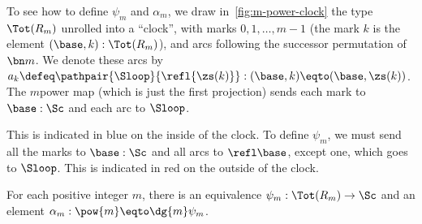 To see how to define $\psi_m$ and $\alpha_m$,
we draw in~\cref{fig:m-power-clock} the type $\Tot(R_m)$
unrolled into a ``clock'', with marks $0,1,\dots,m-1$
(the mark $k$ is the element $(\base,k):\Tot(R_m)$),
and arcs following the successor permutation of $\bn m$.
We denote these arcs by
$a_k \defeq \pathpair{\Sloop}{\refl{\zs(k)}} : (\base,k) \eqto (\base,\zs(k))$.
The $m$\th power map (which is just the first projection)
sends each mark to $\base:\Sc$ and each arc to $\Sloop$.
\begin{marginfigure}
  \caption{Unrolling $\protect\Tot(R_5)$ as a ``clock''. (Here we're going around in a counterclockwise fashion as mathematicians are wont to do.)}
  \label{fig:m-power-clock}
\end{marginfigure}
This is indicated in blue on the inside of the clock.
To define $\psi_m$, we must send all the marks to $\base:\Sc$
and all arcs to $\refl\base$, except one, which goes to $\Sloop$.
This is indicated in red on the outside of the clock.
\begin{construction}\label{con:psi-alpha-m}
  For each positive integer $m$,
  there is an equivalence $\psi_m : \Tot(R_m) \to \Sc$
  and an element $\alpha_m : \pow{m} \eqto \dg{m}\psi_m$.
\end{construction}
